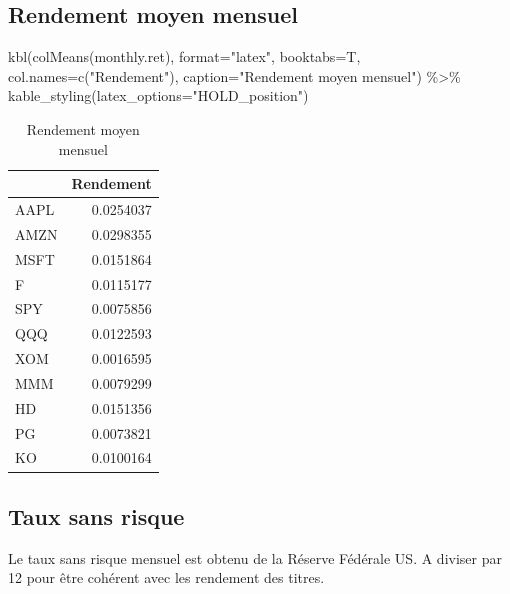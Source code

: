 \documentclass[
]{article}
\newenvironment{Shaded}{\begin{snugshade}}{\end{snugshade}}
\newcommand{\AttributeTok}[1]{\textcolor[rgb]{0.77,0.63,0.00}{#1}}
\newcommand{\FunctionTok}[1]{\textcolor[rgb]{0.00,0.00,0.00}{#1}}
\newcommand{\NormalTok}[1]{#1}
\newcommand{\SpecialCharTok}[1]{\textcolor[rgb]{0.00,0.00,0.00}{#1}}
\newcommand{\StringTok}[1]{\textcolor[rgb]{0.31,0.60,0.02}{#1}}
\begin{document}
\hypertarget{rendement-moyen-mensuel}{%
\subsection{Rendement moyen mensuel}\label{rendement-moyen-mensuel}}

\begin{Shaded}
\begin{Highlighting}[]
\FunctionTok{kbl}\NormalTok{(}\FunctionTok{colMeans}\NormalTok{(monthly.ret), }\AttributeTok{format=}\StringTok{"latex"}\NormalTok{, }\AttributeTok{booktabs=}\NormalTok{T,}
    \AttributeTok{col.names=}\FunctionTok{c}\NormalTok{(}\StringTok{"Rendement"}\NormalTok{), }\AttributeTok{caption=}\StringTok{"Rendement moyen mensuel"}\NormalTok{) }\SpecialCharTok{\%\textgreater{}\%}
    \FunctionTok{kable\_styling}\NormalTok{(}\AttributeTok{latex\_options=}\StringTok{"HOLD\_position"}\NormalTok{)}
\end{Highlighting}
\end{Shaded}

\begin{table}[H]

\caption{\label{tab:unnamed-chunk-3}Rendement moyen mensuel}
\centering
\begin{tabular}[t]{lr}
\toprule
  & Rendement\\
\midrule
AAPL & 0.0254037\\
AMZN & 0.0298355\\
MSFT & 0.0151864\\
F & 0.0115177\\
SPY & 0.0075856\\
\addlinespace
QQQ & 0.0122593\\
XOM & 0.0016595\\
MMM & 0.0079299\\
HD & 0.0151356\\
PG & 0.0073821\\
\addlinespace
KO & 0.0100164\\
\bottomrule
\end{tabular}
\end{table}

\hypertarget{taux-sans-risque}{%
\subsection{Taux sans risque}\label{taux-sans-risque}}

Le taux sans risque mensuel est obtenu de la Réserve Fédérale US. A
diviser par 12 pour être cohérent avec les rendement des titres.
\end{document}
